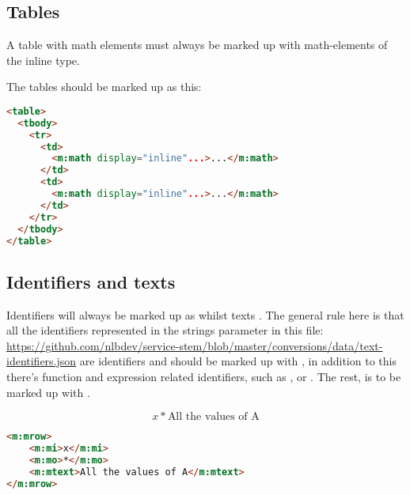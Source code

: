 \documentclass[english,a4paper,11pt]{article}
\begin{document}
\subsection{Tables}

A table with math elements must always be marked up with math-elements of the inline type.

\begin{examples}
The tables should be marked up as this:
\begin{lstlisting}[language=HTML]
<table>
  <tbody>
    <tr>
      <td>
        <m:math display="inline"...>...</m:math>
      </td>
      <td>
        <m:math display="inline"...>...</m:math>
      </td>
    </tr>
  </tbody>
</table>
\end{lstlisting}
\end{examples}

\subsection{Identifiers and texts}

Identifiers will always be marked up as  whilst texts . The general rule here is that all the identifiers represented in the strings parameter in this file: \url{https://github.com/nlbdev/service-stem/blob/master/conversions/data/text-identifiers.json} are identifiers and should be marked up with , in addition to this there's function and expression related identifiers, such as ,  or . The rest, is to be marked up with .

\begin{examples}
\begin{equation}
	x * \text{All the values of A}
\end{equation}
\begin{lstlisting}[language=HTML]
<m:mrow>
	<m:mi>x</m:mi>
	<m:mo>*</m:mo>
	<m:mtext>All the values of A</m:mtext>
</m:mrow>
\end{lstlisting}
\end{examples}
\end{document}

